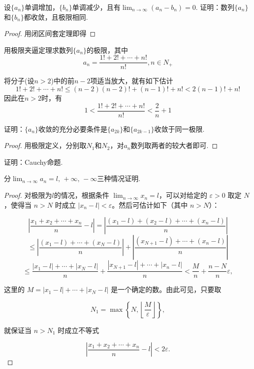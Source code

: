 \documentclass[lang=cn,12pt]{elegantbook}
\begin{document}
\begin{example}
    设$\{a_n\}$单调增加，$\{b_n\}$单调减少，且有$\lim_{n \to \infty} (a_n-b_n)= 0$. 证明：数列$\{a_n\}$和$\{b_n\}$都收敛，且极限相同.
\end{example}

\begin{proof}
    用闭区间套定理即得
\end{proof}

\begin{example}
    用极限夹逼定理求数列$\{a_n\}$的极限，其中\[
    a_n = \frac{1!+ 2! +\cdots+ n!}{n!},n\in N_+
    \]
\end{example}
\begin{solution}
    将分子(设$n > 2$)中的前$n-2$项适当放大，就有如下估计
    \[
    1!+2!+\cdots+n! \leq (n-2)(n-2)! + (n-1)! + n! < 2(n-1)! + n!
    \]
    因此在$n > 2$时，有
    \[
    1 < \frac{1!+2!+\cdots+n!}{n!} < \frac{2}{n} + 1
    \]
\end{solution}

\begin{example}
    证明：$\{a_n\}$收敛的充分必要条件是$\{a_{2k}\}$和$\{a_{2k-1}\}$收敛于同一极限.
\end{example}
\begin{proof}
    用极限定义，分别取$N_1$和$N_2$，对$a_n$数列取两者的较大者即可.
\end{proof}

\begin{example}
    证明：Cauchy命题.
\end{example}
\begin{note}
    分$ \lim_{n \to \infty}a_n = l,\,+\infty,\,-\infty $三种情况证明.
\end{note}
\begin{proof}
    对极限为$l$的情况，根据条件 \(\lim_{n \to \infty} x_n = l\)，可以对给定的 \(\varepsilon > 0\) 取定 \(N\)，使得当 \(n > N\) 时成立 \(|x_n - l| < \varepsilon\)。然后可估计如下（其中 \(n > N\)）：

\[
\left| \frac{x_1 + x_2 + \cdots + x_n}{n} - l \right| = \left| \frac{(x_1 - l) + (x_2 - l) + \cdots + (x_n - l)}{n} \right| 
\]
\[
\leq \left| \frac{(x_1 - l) + \cdots + (x_N - l)}{n} \right| + \left| \frac{(x_{N+1} - l) + \cdots + (x_n - l)}{n} \right|
\]
\[
\leq \frac{|x_1 - l| + \cdots + |x_N - l|}{n} + \frac{|x_{N+1} - l| + \cdots + |x_n - l|}{n}
< \frac{M}{n} + \frac{n - N}{n} \varepsilon,
\]

这里的 \(M = |x_1 - l| + \cdots + |x_N - l|\) 是一个确定的数。由此可见，只要取

\[
N_1 = \max \left\{ N, \left\lfloor \frac{M}{\varepsilon} \right\rfloor \right\},
\]

就保证当 \(n > N_1\) 时成立不等式

\[
\left| \frac{x_1 + x_2 + \cdots + x_n}{n} - l \right| < 2 \varepsilon.
\]
\end{proof}
\end{document}
